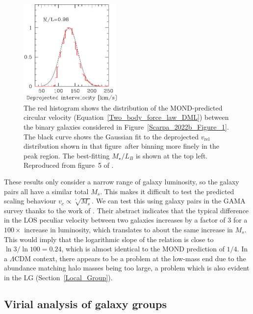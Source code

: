 \documentclass[fleqn,usenatbib,useAMS,onecolumn]{mnras} %
\begin{document}
\begin{figure}
	\centering
	\includegraphics[width=0.45\textwidth]{Scarpa_2022b_Figure_5}
	\caption{The red histogram shows the distribution of the MOND-predicted circular velocity (Equation~\ref{Two_body_force_law_DML}) between the binary galaxies considered in Figure~\ref{Scarpa_2022b_Figure_1}. The black curve shows the Gaussian fit to the deprojected $v_{\text{rel}}$ distribution shown in that figure~after binning more finely in the peak region. The best-fitting $M_\star/L_B$ is shown at the top left. Reproduced from figure~5 of \citet{Scarpa_2022b}.}
	\label{Scarpa_2022b_Figure_5}
\end{figure}

These results only consider a narrow range of galaxy luminosity, so the galaxy pairs all have a similar total $M_s$. This makes it difficult to test the predicted scaling behaviour $v_c \propto \sqrt[^4]{M_s}$. We can test this using galaxy pairs in the GAMA survey \citep{Driver_2011} thanks to the work of \citet{Loveday_2018}. Their abstract indicates that the typical difference in the LOS peculiar velocity between two galaxies increases by a factor of 3 for a $100\times$ increase in luminosity, which translates to about the same increase in $M_s$. This would imply that the logarithmic slope of the relation is close to $\ln 3/\ln 100 = 0.24$, which is almost identical to the MOND prediction of $1/4$. In a $\Lambda$CDM context, there appears to be a problem at the low-mass end due to the abundance matching halo masses being too large, a problem which is also evident in the LG (Section~\ref{Local_Group}).




\subsection{Virial analysis of galaxy groups}
\label{Galaxy_groups_sigma}
\end{document}
